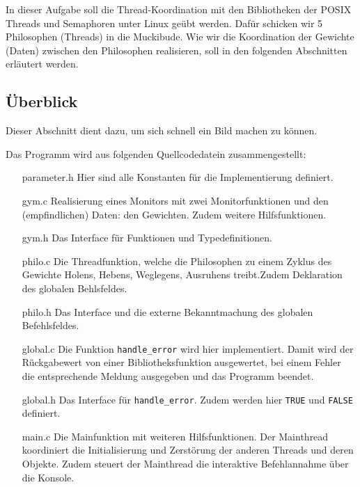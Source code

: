 \documentclass[
   draft=false
  ,paper=a4
  ,twoside=false
  ,fontsize=11pt
  ,headsepline
  ,BCOR10mm
  ,DIV11
  ,parskip=full+
]{scrartcl} %
\begin{document}
In dieser Aufgabe soll die Thread-Koordination mit den Bibliotheken der
POSIX Threads und Semaphoren unter Linux geübt werden. Dafür schicken wir 5
Philosophen (Threads) in die Muckibude. Wie wir die Koordination der Gewichte
(Daten) zwischen den Philosophen realisieren, soll in den folgenden Abschnitten
erläutert werden.

\subsection{Überblick}
Dieser Abschnitt dient dazu, um sich schnell ein Bild machen zu können.

Das Programm wird aus folgenden Quellcodedatein zusammengestellt:
\begin{enumerate}
  \item[parameter.h] Hier sind alle Konstanten für die Implementierung
    definiert.
  \item[gym.c] Realisierung eines Monitors mit zwei Monitorfunktionen und den
    (empfindlichen) Daten: den Gewichten. Zudem weitere Hilfsfunktionen.
  \item[gym.h] Das Interface für Funktionen und Typedefinitionen.
  \item[philo.c] Die Threadfunktion, welche die Philosophen zu einem Zyklus
    des Gewichte Holens, Hebens, Weglegens, Ausruhens treibt.Zudem Deklaration
    des globalen Behlsfeldes.
  \item[philo.h] Das Interface und die externe Bekanntmachung des globalen
   Befehlsfeldes.
  \item[global.c] Die Funktion \texttt{handle\_error} wird hier implementiert.
    Damit wird der Rückgabewert von einer Bibliotheksfunktion ausgewertet,
    bei einem Fehler die entsprechende Meldung ausgegeben und das Programm
    beendet.
  \item[global.h] Das Interface für \texttt{handle\_error}. Zudem werden hier
    \texttt{TRUE} und \texttt{FALSE} definiert.
  \item[main.c] Die Mainfunktion mit weiteren Hilfsfunktionen. Der Mainthread
    koordiniert die Initialisierung und Zerstörung der anderen Threads und
    deren Objekte. Zudem steuert der Mainthread die interaktive Befehlannahme
    über die Konsole.
\end{enumerate}
\end{document}
